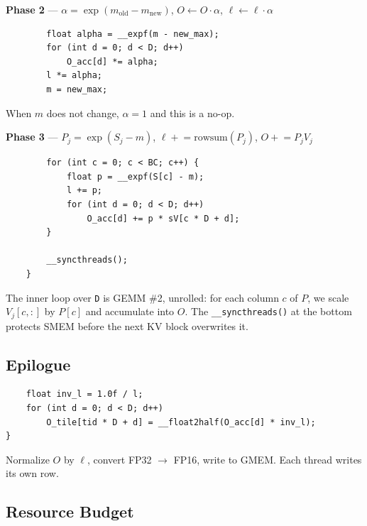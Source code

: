 \documentclass[11pt, letterpaper]{article}
\begin{document}
\medskip
\noindent\textbf{Phase 2} --- $\alpha = \exp(m_{\text{old}} - m_{\text{new}})$, \; $O \leftarrow O \cdot \alpha$, \; $\ell \leftarrow \ell \cdot \alpha$

\begin{lstlisting}
        float alpha = __expf(m - new_max);
        for (int d = 0; d < D; d++)
            O_acc[d] *= alpha;
        l *= alpha;
        m = new_max;
\end{lstlisting}

When $m$ does not change, $\alpha = 1$ and this is a no-op.

\medskip
\noindent\textbf{Phase 3} --- $P_j = \exp(S_j - m)$, \; $\ell \mathrel{+}= \text{rowsum}(P_j)$, \; $O \mathrel{+}= P_j V_j$

\begin{lstlisting}
        for (int c = 0; c < BC; c++) {
            float p = __expf(S[c] - m);
            l += p;
            for (int d = 0; d < D; d++)
                O_acc[d] += p * sV[c * D + d];
        }

        __syncthreads();
    }
\end{lstlisting}

The inner loop over \texttt{D} is GEMM \#2, unrolled: for each column $c$ of $P$, we scale $V_j[c, :]$ by $P[c]$ and accumulate into $O$. The \texttt{\_\_syncthreads()} at the bottom protects SMEM before the next KV block overwrites it.

\subsection{Epilogue}

\begin{lstlisting}
    float inv_l = 1.0f / l;
    for (int d = 0; d < D; d++)
        O_tile[tid * D + d] = __float2half(O_acc[d] * inv_l);
}
\end{lstlisting}

Normalize $O$ by $\ell$, convert FP32 $\to$ FP16, write to GMEM. Each thread writes its own row.

\subsection{Resource Budget}
\end{document}

